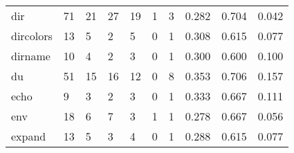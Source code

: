 \begin{longtable}{lp{2.0cm}p{2.0cm}p{2.0cm}p{2.0cm}p{2.0cm}p{2.0cm}p{2.0cm}p{2.0cm}p{2.0cm}}
dir       &                     71 &                                            21 &                                           27 &                                          19 &                                            1 &                                          3 &                                0.282 &                                  0.704 &                                0.042 \\
dircolors &                     13 &                                             5 &                                            2 &                                           5 &                                            0 &                                          1 &                                0.308 &                                  0.615 &                                0.077 \\
dirname   &                     10 &                                             4 &                                            2 &                                           3 &                                            0 &                                          1 &                                0.300 &                                  0.600 &                                0.100 \\
du        &                     51 &                                            15 &                                           16 &                                          12 &                                            0 &                                          8 &                                0.353 &                                  0.706 &                                0.157 \\
echo      &                      9 &                                             3 &                                            2 &                                           3 &                                            0 &                                          1 &                                0.333 &                                  0.667 &                                0.111 \\
env       &                     18 &                                             6 &                                            7 &                                           3 &                                            1 &                                          1 &                                0.278 &                                  0.667 &                                0.056 \\
expand    &                     13 &                                             5 &                                            3 &                                           4 &                                            0 &                                          1 &                                0.288 &                                  0.615 &                                0.077 \\

\end{longtable}
